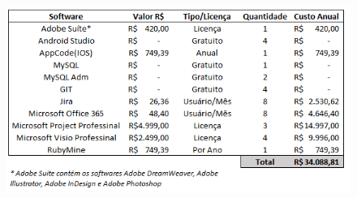 \begin{figure}[htb]
	\begin{center}
	    \includegraphics[scale=0.7]{figuras/custoSoftwares}
	\end{center}
\end{figure}

    

